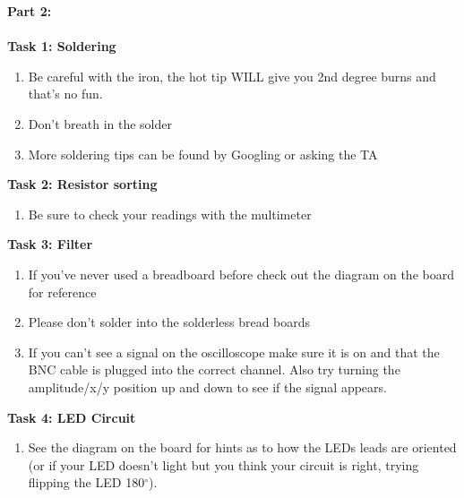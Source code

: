\documentclass[12pt]{article}
\begin{document}
\noindent\textbf{Part 2:}\\
\\
\indent\textbf{Task 1: Soldering}
\begin{enumerate}
  \item Be careful with the iron, the hot tip WILL give you 2nd degree burns and that's no fun.
  \item Don't breath in the solder
  \item More soldering tips can be found by Googling or asking the TA
\end{enumerate}

\textbf{Task 2: Resistor sorting}
\begin{enumerate}
  \item Be sure to check your readings with the multimeter
\end{enumerate}

\textbf{Task 3: Filter}
\begin{enumerate}
  \item If you've never used a breadboard before check out the diagram on the board for reference
  \item Please don't solder into the solderless bread boards
  \item If you can't see a signal on the oscilloscope make sure it is on and that the BNC cable is plugged into the correct channel. Also try turning the amplitude/x/y position up and down to see if the signal appears.
\end{enumerate}

\textbf{Task 4: LED Circuit}
\begin{enumerate}
  \item See the diagram on the board for hints as to how the LEDs leads are oriented (or if your LED doesn't light but you think your circuit is right, trying flipping the LED 180$^{\circ}$).
\end{enumerate}
\end{document}

